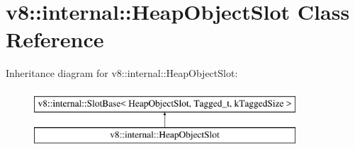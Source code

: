 \hypertarget{classv8_1_1internal_1_1HeapObjectSlot}{}\section{v8\+:\+:internal\+:\+:Heap\+Object\+Slot Class Reference}
\label{classv8_1_1internal_1_1HeapObjectSlot}
Inheritance diagram for v8\+:\+:internal\+:\+:Heap\+Object\+Slot\+:\begin{figure}[H]
\begin{center}
\leavevmode
\includegraphics[height=2.000000cm]{classv8_1_1internal_1_1HeapObjectSlot}
\end{center}
\end{figure}
